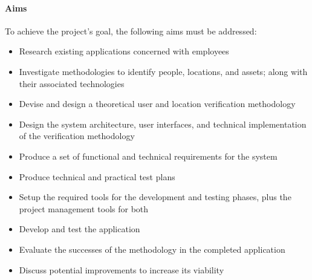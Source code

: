 \paragraph{Aims}
To achieve the project's goal, the following aims must be
addressed:

\begin{itemize}
  \item Research existing applications concerned with
         employees
  \item Investigate methodologies to identify people,
        locations, and assets; along with their associated
        technologies
  \item Devise and design a theoretical user and location
        verification methodology
  \item Design the system architecture, user interfaces,
        and technical implementation of the
        verification methodology
  \item Produce a set of functional and technical
        requirements for the system
  \item Produce technical and practical test plans
  \item Setup the required tools for the development and
        testing phases, plus the project management tools
        for both
  \item Develop and test the application
  \item Evaluate the successes of the methodology in the
        completed application
  \item Discuss potential improvements to increase its
        viability
\end{itemize}